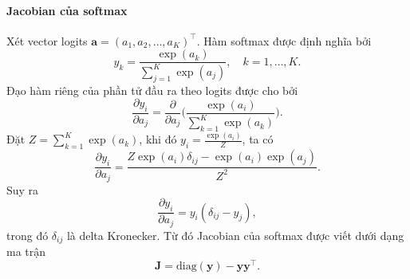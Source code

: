 \paragraph{Jacobian của softmax}

Xét vector logits $\boldsymbol{a} = (a_1, a_2, \dots, a_K)^{\intercal}$. Hàm
softmax được định nghĩa bởi \begin{equation}
  y_k = \frac{\exp(a_k)}{\sum_{j=1}^{K} \exp(a_j)}, \quad k = 1, \dots, K.
\end{equation} Đạo hàm riêng của phần tử đầu ra theo logits được cho bởi
\begin{equation}
  \frac{\partial y_i}{\partial a_j} = \frac{\partial}{\partial a_j} \biggl(
  \frac{\exp(a_i)}{\sum_{k=1}^{K} \exp(a_k)} \biggr).
\end{equation} Đặt $Z = \sum_{k=1}^{K} \exp(a_k)$, khi đó $y_i =
\frac{\exp(a_i)}{Z}$, ta có \begin{equation}
  \frac{\partial y_i}{\partial a_j} = \frac{Z \exp(a_i)\delta_{ij} -
  \exp(a_i)\exp(a_j)}{Z^2}.
\end{equation} Suy ra \begin{equation}
  \frac{\partial y_i}{\partial a_j} = y_i(\delta_{ij} - y_j),
\end{equation} trong đó $\delta_{ij}$ là delta Kronecker. Từ đó Jacobian của
softmax được viết dưới dạng ma trận \begin{equation}
  \boldsymbol{J} = \mathrm{diag}(\boldsymbol{y}) -
  \boldsymbol{y}\boldsymbol{y}^{\intercal}.
\end{equation}
